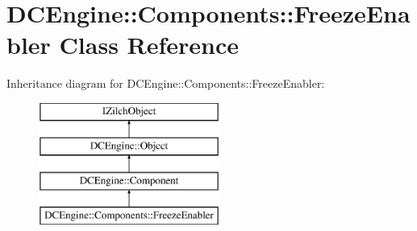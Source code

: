 \hypertarget{classDCEngine_1_1Components_1_1FreezeEnabler}{\section{D\-C\-Engine\-:\-:Components\-:\-:Freeze\-Enabler Class Reference}
\label{classDCEngine_1_1Components_1_1FreezeEnabler}
}
Inheritance diagram for D\-C\-Engine\-:\-:Components\-:\-:Freeze\-Enabler\-:\begin{figure}[H]
\begin{center}
\leavevmode
\includegraphics[height=4.000000cm]{classDCEngine_1_1Components_1_1FreezeEnabler}
\end{center}
\end{figure}
